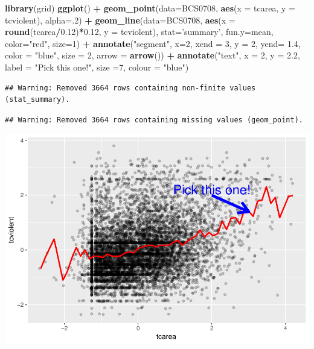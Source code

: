 \documentclass[]{book}
\newenvironment{Shaded}{\begin{snugshade}}{\end{snugshade}}
\newcommand{\DataTypeTok}[1]{\textcolor[rgb]{0.13,0.29,0.53}{#1}}
\newcommand{\DecValTok}[1]{\textcolor[rgb]{0.00,0.00,0.81}{#1}}
\newcommand{\FloatTok}[1]{\textcolor[rgb]{0.00,0.00,0.81}{#1}}
\newcommand{\KeywordTok}[1]{\textcolor[rgb]{0.13,0.29,0.53}{\textbf{#1}}}
\newcommand{\NormalTok}[1]{#1}
\newcommand{\OperatorTok}[1]{\textcolor[rgb]{0.81,0.36,0.00}{\textbf{#1}}}
\newcommand{\StringTok}[1]{\textcolor[rgb]{0.31,0.60,0.02}{#1}}
\theoremstyle{definition}
\theoremstyle{definition}
\theoremstyle{definition}
\theoremstyle{remark}
\begin{document}
\begin{Shaded}
\begin{Highlighting}[]
\KeywordTok{library}\NormalTok{(grid)}
\KeywordTok{ggplot}\NormalTok{() }\OperatorTok{+}
\StringTok{  }\KeywordTok{geom_point}\NormalTok{(}\DataTypeTok{data=}\NormalTok{BCS0708, }\KeywordTok{aes}\NormalTok{(}\DataTypeTok{x =}\NormalTok{ tcarea, }\DataTypeTok{y =}\NormalTok{ tcviolent), }\DataTypeTok{alpha=}\NormalTok{.}\DecValTok{2}\NormalTok{) }\OperatorTok{+}
\KeywordTok{geom_line}\NormalTok{(}\DataTypeTok{data=}\NormalTok{BCS0708, }\KeywordTok{aes}\NormalTok{(}\DataTypeTok{x =} \KeywordTok{round}\NormalTok{(tcarea}\OperatorTok{/}\FloatTok{0.12}\NormalTok{)}\OperatorTok{*}\FloatTok{0.12}\NormalTok{, }\DataTypeTok{y =}\NormalTok{ tcviolent), }
          \DataTypeTok{stat=}\StringTok{'summary'}\NormalTok{,}
          \DataTypeTok{fun.y=}\NormalTok{mean,}
          \DataTypeTok{color=}\StringTok{"red"}\NormalTok{,}
          \DataTypeTok{size=}\DecValTok{1}\NormalTok{) }\OperatorTok{+}
\StringTok{  }\KeywordTok{annotate}\NormalTok{(}\StringTok{"segment"}\NormalTok{, }\DataTypeTok{x=}\DecValTok{2}\NormalTok{, }\DataTypeTok{xend =} \DecValTok{3}\NormalTok{, }\DataTypeTok{y =} \DecValTok{2}\NormalTok{, }\DataTypeTok{yend=} \FloatTok{1.4}\NormalTok{, }\DataTypeTok{color =} \StringTok{"blue"}\NormalTok{, }\DataTypeTok{size =} \DecValTok{2}\NormalTok{, }\DataTypeTok{arrow =} \KeywordTok{arrow}\NormalTok{()) }\OperatorTok{+}
\StringTok{  }\KeywordTok{annotate}\NormalTok{(}\StringTok{"text"}\NormalTok{, }\DataTypeTok{x =} \DecValTok{2}\NormalTok{, }\DataTypeTok{y =} \FloatTok{2.2}\NormalTok{, }\DataTypeTok{label =} \StringTok{"Pick this one!"}\NormalTok{, }\DataTypeTok{size =}\DecValTok{7}\NormalTok{, }\DataTypeTok{colour =} \StringTok{"blue"}\NormalTok{)}
\end{Highlighting}
\end{Shaded}

\begin{verbatim}
## Warning: Removed 3664 rows containing non-finite values (stat_summary).
\end{verbatim}

\begin{verbatim}
## Warning: Removed 3664 rows containing missing values (geom_point).
\end{verbatim}

\includegraphics{08-regression_files/figure-latex/unnamed-chunk-6-1.pdf}
\end{document}
